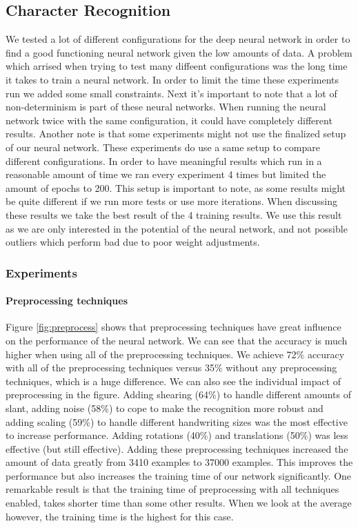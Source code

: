 \documentclass{article}
\begin{document}
\subsection{Character Recognition}
\label{sec:expres}
We tested a lot of different configurations for the deep neural network in order to find a good functioning neural network given the low amounts of data. A problem which arrised when trying to test many diffeent configurations was the long time it takes to train a neural network. In order to limit the time these experiments run we added some small constraints. Next it's important to note that a lot of non-determinism is part of these neural networks. When running the neural network twice with the same configuration, it could have completely different results. 
Another note is that some experiments might not use the finalized setup of our neural network. These experiments do use a same setup to compare different configurations. 
In order to have meaningful results which run in a reasonable amount of time we ran every experiment 4 times but limited the amount of epochs to 200. This setup is important to note, as some results might be quite different if we run more tests or use more iterations. When discussing these results we take the best result of the 4 training results. 
We use this result as we are only interested in the potential of the neural network, and not possible outliers which perform bad due to poor weight adjustments.  
\subsubsection{Experiments}
\paragraph{Preprocessing techniques}
Figure \ref{fig:preprocess} shows that preprocessing techniques have great influence on the performance of the neural network. We can see that the accuracy is much higher when using all of the preprocessing techniques.  
We achieve 72\% accuracy with all of the preprocessing techniques versus 35\% without any preprocessing techniques, which is a huge difference. 
We can also see the individual impact of preprocessing in the figure. Adding shearing (64\%) to handle different amounts of slant, adding noise (58\%) to cope to make the recognition more robust and adding scaling (59\%) to handle different handwriting sizes was the most effective to increase performance. Adding rotations (40\%) and translations (50\%) was less effective (but still effective). Adding these preprocessing techniques increased the amount of data greatly from 3410 examples to 37000 examples. This improves the performance but also increases the training time of our network significantly. One remarkable result is that the training time of preprocessing with all techniques enabled, takes shorter time than some other results. When we look at the average however, the training time is the highest for this case. 
\end{document}
